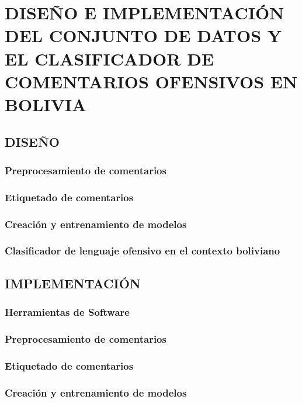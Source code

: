 \chapter{DISEÑO E IMPLEMENTACIÓN DEL CONJUNTO DE DATOS Y EL CLASIFICADOR DE COMENTARIOS OFENSIVOS EN BOLIVIA}\label{chp-resfttx}

\section{DISEÑO}

\subsection{Preprocesamiento de comentarios}

\subsection{Etiquetado de comentarios}

\subsection{Creación y entrenamiento de modelos}

\subsection{Clasificador de lenguaje ofensivo en el contexto boliviano}

\section{IMPLEMENTACIÓN}

\subsection{Herramientas de Software}

\subsection{Preprocesamiento de comentarios}

\subsection{Etiquetado de comentarios}

\subsection{Creación y entrenamiento de modelos}

